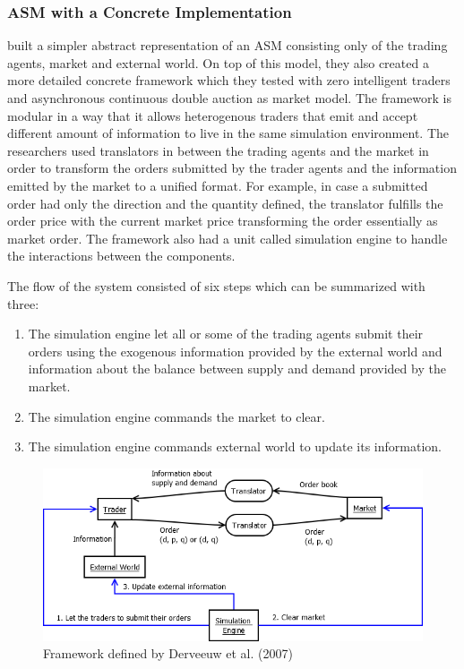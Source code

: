 \subsubsection{ASM with a Concrete Implementation}
\citet{Julien07} built a simpler abstract representation of an ASM consisting
only of the trading agents, market and external world. On top of this model, 
they also created a more detailed concrete framework which they tested with
zero intelligent traders and asynchronous continuous double auction as market
model. The framework is modular in a way that it allows heterogenous traders
that emit and accept different amount of information to live in the same 
simulation environment. The researchers used translators in between the 
trading agents and the market in order to transform the orders submitted by
the trader agents and the information emitted by the market to a unified format.
For example, in case a submitted order had only the direction and the quantity 
defined, the translator fulfills the order price with the current market price 
transforming the order essentially as market order. The framework also had a
unit called simulation engine to handle the interactions between the components.

The flow of the system consisted of six steps which can be summarized with three:
\begin{enumerate}
    \item The simulation engine let all or some of the trading agents submit their orders 
            using the exogenous information provided by the external world and 
            information about the balance between supply and demand provided by the market.
    \item The simulation engine commands the market to clear.
    \item The simulation engine commands external world to update its information.
\end{enumerate}


\begin{figure}
    \includegraphics[width=\linewidth]{diagrams/julien_market.png}
    \caption{Framework defined by Derveeuw et al. (2007)}
\end{figure}

